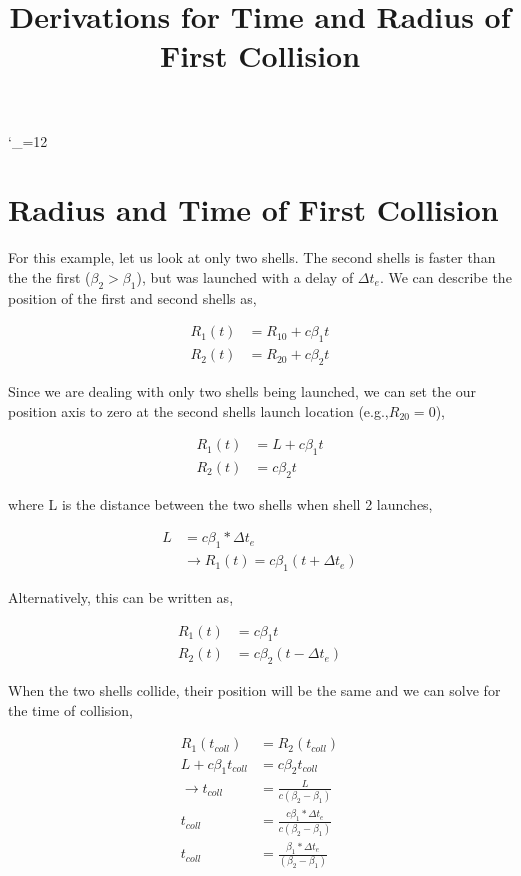 \documentclass[10pt]{article}
\title{Derivations for Time and Radius of First Collision}
\def\upsubscripts{\catcode`\_=12 } \def\normalsubscripts{\catcode`\_=8 }
\begin{document}
\upsubscripts

\section*{Radius and Time of First Collision}

For this example, let us look at only two shells. The second shells is faster than the the first ($\beta_2 > \beta_1$), but was launched with a delay of $\Delta t_e$. We can describe the position of the first and second shells as,

\begin{align}
	R_1(t) &= R_{10} + c \beta_1 t \\
	R_2(t) &= R_{20} + c \beta_2 t
\end{align}

Since we are dealing with only two shells being launched, we can set the our position axis to zero at the second shells launch location (e.g.,$R_{20} = 0$), 

\begin{align}
	R_1(t) &= L + c \beta_1 t \\
	R_2(t) &= c \beta_2 t
\end{align}

where L is the distance between the two shells when shell 2 launches,

\begin{align}
	L &= c\beta_1*\Delta t_e\\
	&\rightarrow R_1(t) = c \beta_1 (t + \Delta t_e)
\end{align}

Alternatively, this can be written as,

\begin{align}
	R_1(t) &= c \beta_1 t \\
	R_2(t) &= c \beta_2 (t-\Delta t_e)
\end{align}

When the two shells collide, their position will be the same and we can solve for the time of collision,

\begin{align}
	R_1(t_{coll}) &= R_2(t_{coll})\\
	L + c\beta_1 t_{coll} &= c \beta_2 t_{coll}\\
	\rightarrow t_{coll} &= \frac{L}{c(\beta_2 - \beta_1)}\\
	t_{coll} &= \frac{c\beta_1*\Delta t_e}{c(\beta_2 - \beta_1)}\\
	t_{coll} &= \frac{\beta_1*\Delta t_e}{(\beta_2 - \beta_1)}
\end{align}
\end{document}
